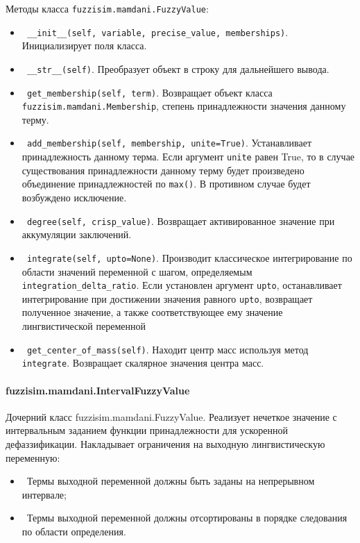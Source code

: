 Методы класса \lstinline!fuzzisim.mamdani.FuzzyValue!:
\begin{itemize}
	\item \lstinline! __init__(self, variable, precise_value, memberships)!. Инициализирует поля класса.
	\item \lstinline! __str__(self)!.   Преобразует объект в строку для дальнейшего вывода.
	\item \lstinline! get_membership(self, term)!. Возвращает объект класса \lstinline!fuzzisim.mamdani.Membership!, степень принадлежности значения данному терму.
	\item \lstinline! add_membership(self, membership, unite=True)!. Устанавливает принадлежность данному терма. Если аргумент \lstinline!unite! равен True, то в случае существования принадлежности данному терму будет произведено объединение принадлежностей по \lstinline!max()!. В противном случае будет возбуждено исключение.
	\item \lstinline! degree(self, crisp_value)!.  Возвращает активированное значение при аккумуляции заключений.
	\item \lstinline! integrate(self, upto=None)!. Производит классическое интегрирование по области значений переменной с шагом, определяемым \lstinline!integration_delta_ratio!. Если установлен аргумент \lstinline!upto!, останавливает интегрирование при достижении значения равного \lstinline!upto!, возвращает полученное значение, а также соответствующее ему значение лингвистической переменной
	\item \lstinline! get_center_of_mass(self)!. Находит центр масс используя метод \lstinline!integrate!. Возвращает скалярное значения центра масс.
\end{itemize}




\paragraph{fuzzisim.mamdani.IntervalFuzzyValue}

Дочерний класс fuzzisim.mamdani.FuzzyValue. Реализует нечеткое значение с интервальным заданием функции принадлежности для ускоренной дефаззификации. Накладывает ограничения на выходную лингвистическую переменную:

\begin{itemize}
	\item \lstinline! !Термы выходной переменной должны быть заданы на непрерывном интервале;
	\item \lstinline! !Термы выходной переменной должны отсортированы в порядке следования по области определения.
\end{itemize}

